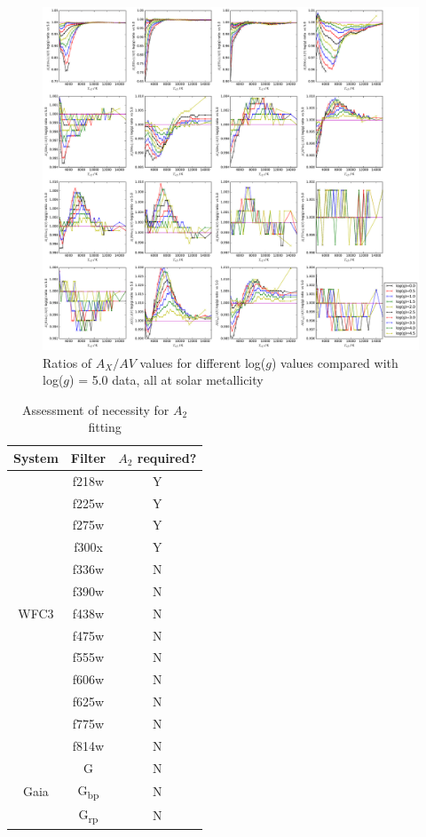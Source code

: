 \documentclass[12pt, a4paper]{report}
\begin{document}
\begin{figure}[h]
\begin{center}
\includegraphics[scale=0.3]{../Aall_ratio_all_logg_div_5p0_effect.pdf}
\caption{Ratios of $A_{X}/A{V}$ values for different log($g$) values compared with log($g$) = 5.0 data, all at solar metallicity}
\label{all_logg_logg5_ratio}
\end{center}
\end{figure}

\begin{table}
\begin{center}
\begin{tabular}{ccc}
\hline
System & Filter & $A_{2}$ required? \\
\hline
& f218w & Y \\
& f225w & Y \\
& f275w & Y \\
& f300x & Y \\
& f336w & N \\
& f390w & N \\
WFC3 & f438w & N \\
& f475w & N \\
& f555w & N \\
& f606w & N \\
& f625w & N \\
& f775w & N \\
& f814w & N \\
\hline
& G & N \\
Gaia & G\textsubscript{bp} & N \\
& G\textsubscript{rp} & N \\ \hline

\end{tabular}
\caption{Assessment of necessity for $A_{2}$ fitting}
\label{R2_yn_table}
\end{center}
\end{table}
\end{document}
